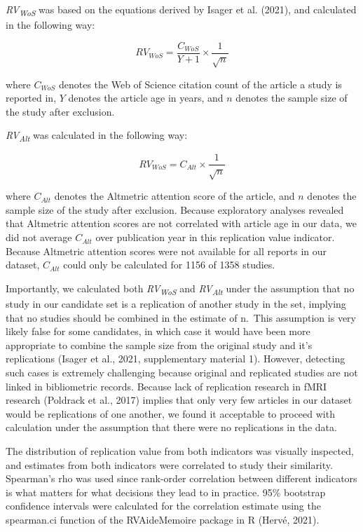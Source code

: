 \documentclass[
  english,
  man,floatsintext]{apa6}
\begin{document}
\emph{RV\textsubscript{WoS}} was based on the equations derived by Isager et al. (2021), and calculated in the following way:

\begin{equation} 
  \tag{2}
  RV_{WoS} = \frac{C_{WoS}}{Y+1}\times\frac{1}{\sqrt{n}}
  \label{eq:2}
\end{equation}

where \(C_{WoS}\) denotes the Web of Science citation count of the article a study is reported in, \(Y\) denotes the article age in years, and \(n\) denotes the sample size of the study after exclusion.

\emph{RV\textsubscript{Alt}} was calculated in the following way:

\begin{equation} 
  \tag{3}
  RV_{WoS} = C_{Alt}\times\frac{1}{\sqrt{n}}
  \label{eq:3}
\end{equation}

where \(C_{Alt}\) denotes the Altmetric attention score of the article, and \(n\) denotes the sample size of the study after exclusion. Because exploratory analyses revealed that Altmetric attention scores are not correlated with article age in our data, we did not average \(C_{Alt}\) over publication year in this replication value indicator. Because Altmetric attention scores were not available for all reports in our dataset, \(C_{Alt}\) could only be calculated for 1156 of 1358 studies.

Importantly, we calculated both \emph{RV\textsubscript{WoS}} and \emph{RV\textsubscript{Alt}} under the assumption that no study in our candidate set is a replication of another study in the set, implying that no studies should be combined in the estimate of n.~This assumption is very likely false for some candidates, in which case it would have been more appropriate to combine the sample size from the original study and it's replications (Isager et al., 2021, supplementary material 1). However, detecting such cases is extremely challenging because original and replicated studies are not linked in bibliometric records. Because lack of replication research in fMRI research (Poldrack et al., 2017) implies that only very few articles in our dataset would be replications of one another, we found it acceptable to proceed with calculation under the assumption that there were no replications in the data.

The distribution of replication value from both indicators was visually inspected, and estimates from both indicators were correlated to study their similarity. Spearman's rho was used since rank-order correlation between different indicators is what matters for what decisions they lead to in practice. 95\% bootstrap confidence intervals were calculated for the correlation estimate using the spearman.ci function of the RVAideMemoire package in R (Hervé, 2021).
\end{document}
